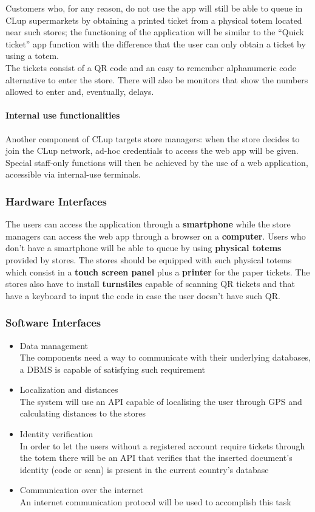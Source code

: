 Customers who, for any reason, do not use the app will still be able to queue in CLup supermarkets by obtaining a printed ticket from a physical totem located near such stores; the functioning of the application will be similar to the “Quick ticket” app function with the difference that the user can only obtain a ticket by using a totem. \\
The tickets consist of a QR code and an easy to remember alphanumeric code alternative to enter the store. There will also be monitors that show the numbers allowed to enter and, eventually, delays.
\paragraph{Internal use functionalities}
Another component of CLup targets store managers: when the store decides to join the CLup network, ad-hoc credentials to access the web app will be given. Special staff-only functions will then be achieved by the use of a web application, accessible via internal-use terminals.

\subsubsection{Hardware Interfaces}
The users can access the application through a \textbf{smartphone} while the store managers can access the web app through a browser on a \textbf{computer}. Users who don’t have a smartphone will be able to queue by using \textbf{physical totems} provided by stores.
The stores should be equipped with such physical totems which consist in a \textbf{touch screen panel} plus a \textbf{printer} for the paper tickets. The stores also have to install \textbf{turnstiles} capable of scanning QR tickets and that have a keyboard to input the code in case the user doesn’t have such QR.
\subsubsection{Software Interfaces}
\begin{itemize}
    \item Data management\\
The components need a way to communicate with their underlying databases, a DBMS is capable of satisfying such requirement
    \item Localization and distances\\
The system will use an API capable of localising the user through GPS and calculating distances to the stores\
    \item Identity verification\\
In order to let the users without a registered account require tickets through the totem there will be an API that verifies that the inserted document’s identity (code or scan) is present in the current country’s database
    \item Communication over the internet\\
An internet communication protocol will be used to accomplish this task
\end{itemize}

